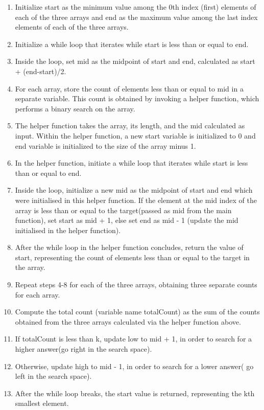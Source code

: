 \documentclass[8pt]{article}
\begin{document}
\begin{enumerate}

\item Initialize start as the minimum value among the 0th index (first) elements of each of the three arrays and end as the maximum value among the last index elements of each of the three arrays.

\item Initialize a while loop that iterates while start is less than or equal to end.

\item Inside the loop, set mid as the midpoint of start and end, calculated as start + (end-start)/2.

\item For each array, store the count of elements less than or equal to mid in a separate variable. This count is obtained by invoking a helper function, which performs a binary search on the array.

\item The helper function takes the array, its length, and the mid calculated as input. Within the helper function, a new start variable is initialized to 0 and end variable is initialized to the size of the array minus 1.

\item In the helper function, initiate a while loop that iterates while start is less than or equal to end.

\item Inside the loop, initialize a new mid as the midpoint of start and end which were initialised in this helper function. If the element at the mid index of the array is less than or equal to the target(passed as mid from the main function), set start as mid + 1, else set end as mid - 1 (update the mid initialised in the helper function).

\item After the while loop in the helper function concludes, return the value of start, representing the count of elements less than or equal to the target in the array.

\item Repeat steps 4-8 for each of the three arrays, obtaining three separate counts for 
each array.

\item Compute the total count (variable name totalCount) as the sum of the counts obtained from the three arrays calculated via the helper function above.

\item If totalCount is less than k, update low to mid + 1, in order to search for a higher answer(go right in the search space).

\item Otherwise, update high to mid - 1, in order to search for a lower answer( go left in the search space).

\item After the while loop breaks, the start value is returned, representing the kth smallest element.

\end{enumerate}
\end{document}
